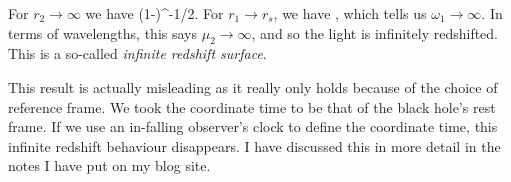 For $r_2\to \infty$ we have
\bse
     \to  \bigg(1-\bigg)^{-1/2}.
\ese
For $r_1\to r_s$, we have
\bse
     \to \infty,
\ese
which tells us $\omega_1\to \infty$. In terms of wavelengths, this says $\mu_2\to\infty$, and so the light is infinitely redshifted. This is a so-called \textit{infinite redshift surface}.

This result is actually misleading as it really only holds because of the choice of reference frame. We took the coordinate time to be that of the black hole's rest frame. If we use an in-falling observer's clock to define the coordinate time, this infinite redshift behaviour disappears. I have discussed this in more detail in the notes I have put on my blog site.
